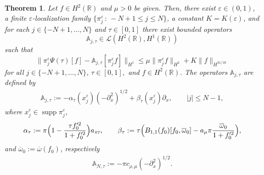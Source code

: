 \documentclass[11pt,reqno]{amsart}
\numberwithin{equation}{section}
\newcommand{\0}{\Omega}
\newcommand{\e}{\varepsilon}
\newcommand{\p}{\partial}
\newcommand{\ov}{\overline}
\newcommand{\oo}{\ov\omega}
\newcommand{\bA}{\mathbb{A}}
\newcommand{\kL}{\mathcal{L}}
\newcommand{\R}{\mathbb{R}}
\DeclareMathOperator{\supp}{supp}
\newtheorem{thm}{Theorem}[section]
\numberwithin{equation}{section}
\begin{document}
 \begin{thm}\label{T2} 
Let $f\in H^2(\R)$ and  $\mu>0$ be given. 
Then, there exist $\e\in(0,1)$, a finite $\e$-locali\-za\-tion family  $\{\pi_j^\e\,:\, -N+1\leq j\leq N\} $, a   constant $K=K(\e)$, 
and for each  $ j\in\{-N+1,\ldots,N\}$ and $\tau\in[0,1]$ there 
exist bounded operators $$\bA_{ j,\tau}\in\kL(H^2(\R), H^1(\R))$$
 such that 
 \begin{equation}\label{D1}
  \|\pi_j^\e \Psi(\tau) [f]-\bA_{j,\tau}[\pi^\e_j f]\|_{H^1}\leq \mu \|\pi_j^\e f\|_{H^2}+K\|  f\|_{H^{31/16}}
 \end{equation}
 for all $ j\in\{-N+1,\ldots,N\}$, $\tau\in[0,1],$ and  $f\in H^2(\R)$. The operators $\bA_{j,\tau}$ are defined  by 
  \begin{align*} 
 \bA_{j,\tau }:=- \alpha_\tau(x_j^\e) (-\p_x^2 )^{1/2}+\beta_\tau (x_j^\e)\p_x, \qquad |j|\leq N-1, 
 \end{align*}
 where  $x_j^\e\in \supp  \pi_j^\e$, 
 \begin{align*}
 \alpha_\tau:=\pi{\Big(1-\frac{\tau f_0'^2}{1+f_0'^2}\Big)} a_{\text{\tiny{\em RT}}}, \qquad  \beta_\tau:=\tau\Big(B_{1,1}(f_0)[f_0,\oo_0]-a_\mu\pi\frac{\oo_0}{1+f_0'^2}\Big),   
 \end{align*}
 and $\oo_0:=\oo(f_0)$, respectively
 \begin{align*} 
 \bA_{N,\tau }:= -  \pi c_{\rho,\mu} (-\p_x^2)^{1/2}. 
 \end{align*}
\end{thm}
\end{document}
